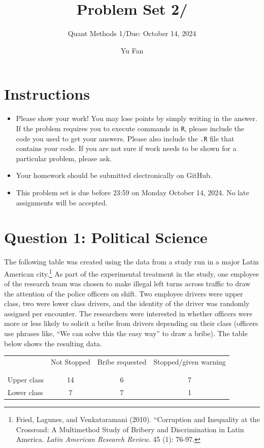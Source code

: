 \documentclass[12pt,letterpaper]{article}
\title{Problem Set 2/}
\date{Yu Fan}
\author{Quant Methods 1/Due: October 14, 2024}
\begin{document}
	\maketitle
	\section*{Instructions}
	\begin{itemize}
		\item Please show your work! You may lose points by simply writing in the answer. If the problem requires you to execute commands in \texttt{R}, please include the code you used to get your answers. Please also include the \texttt{.R} file that contains your code. If you are not sure if work needs to be shown for a particular problem, please ask.
		\item Your homework should be submitted electronically on GitHub.
		\item This problem set is due before 23:59 on Monday October 14, 2024. No late assignments will be accepted.
		
	\end{itemize}
	
	
	\vspace{.5cm}
	\section*{Question 1: Political Science}
	\vspace{.25cm}
	The following table was created using the data from a study run in a major Latin American city.\footnote{Fried, Lagunes, and Venkataramani (2010). ``Corruption and Inequality at the Crossroad: A Multimethod Study of Bribery and Discrimination in Latin America. \textit{Latin American Research Review}. 45 (1): 76-97.} As part of the experimental treatment in the study, one employee of the research team was chosen to make illegal left turns across traffic to draw the attention of the police officers on shift. Two employee drivers were upper class, two were lower class drivers, and the identity of the driver was randomly assigned per encounter. The researchers were interested in whether officers were more or less likely to solicit a bribe from drivers depending on their class (officers use phrases like, ``We can solve this the easy way'' to draw a bribe). The table below shows the resulting data.
	
	\newpage
	\begin{table}[h!]
		\centering
		\begin{tabular}{l | c c c }
			& Not Stopped & Bribe requested & Stopped/given warning \\
			\\[-1.8ex] 
			\hline \\[-1.8ex]
			Upper class & 14 & 6 & 7 \\
			Lower class & 7 & 7 & 1 \\
			\hline
		\end{tabular}
	\end{table}
	
\end{document}
